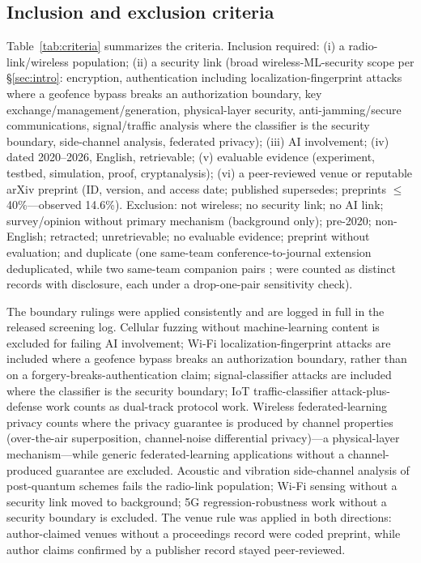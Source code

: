 \subsection{Inclusion and exclusion criteria}
Table~\ref{tab:criteria} summarizes the criteria. Inclusion required: (i) a radio-link/wireless population; (ii) a security link (broad wireless-ML-security scope per \S\ref{sec:intro}: encryption, authentication including localization-fingerprint attacks where a geofence bypass breaks an authorization boundary, key exchange/management/generation, physical-layer security, anti-jamming/secure communications, signal/traffic analysis where the classifier is the security boundary, side-channel analysis, federated privacy); (iii) AI involvement; (iv) dated 2020--2026, English, retrievable; (v) evaluable evidence (experiment, testbed, simulation, proof, cryptanalysis); (vi) a peer-reviewed venue or reputable arXiv preprint (ID, version, and access date; published supersedes; preprints $\le$40\%---observed 14.6\%). Exclusion: not wireless; no security link; no AI link; survey/opinion without primary mechanism (background only); pre-2020; non-English; retracted; unretrievable; no evaluable evidence; preprint without evaluation; and duplicate (one same-team conference-to-journal extension deduplicated, while two same-team companion pairs ;  were counted as distinct records with disclosure, each under a drop-one-pair sensitivity check).

The boundary rulings were applied consistently and are logged in full in the released screening log. Cellular fuzzing without machine-learning content is excluded for failing AI involvement; Wi-Fi localization-fingerprint attacks are included where a geofence bypass breaks an authorization boundary, rather than on a forgery-breaks-authentication claim; signal-classifier attacks are included where the classifier is the security boundary; IoT traffic-classifier attack-plus-defense work counts as dual-track protocol work. Wireless federated-learning privacy counts where the privacy guarantee is produced by channel properties (over-the-air superposition, channel-noise differential privacy)---a physical-layer mechanism---while generic federated-learning applications without a channel-produced guarantee are excluded. Acoustic and vibration side-channel analysis of post-quantum schemes fails the radio-link population; Wi-Fi sensing without a security link moved to background; 5G regression-robustness work without a security boundary is excluded. The venue rule was applied in both directions: author-claimed venues without a proceedings record were coded preprint, while author claims confirmed by a publisher record stayed peer-reviewed.

